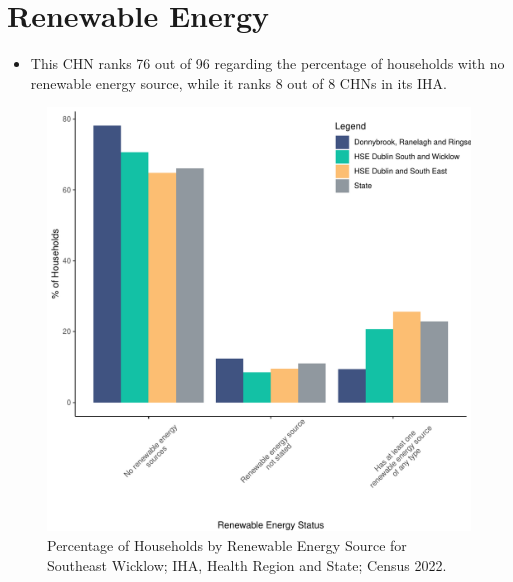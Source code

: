 \documentclass{article}
\begin{document}
\section{Renewable Energy}\label{sect:RE}
\begin{itemize}
\item This CHN ranks  76 out of 96 regarding the percentage of households with no renewable energy source, while it ranks   8 out of 8 CHNs in its IHA.
\end{itemize}
\begin{figure}[H]
	\centering
	\includegraphics[width = 140mm]{../figures/RenewableEnergyED.pdf}
	\caption{Percentage of Households by Renewable Energy Source for Southeast Wicklow; IHA, Health Region and State; Census 2022.}
	\label{fig:vbnv}
	\end{figure}
\end{document}
